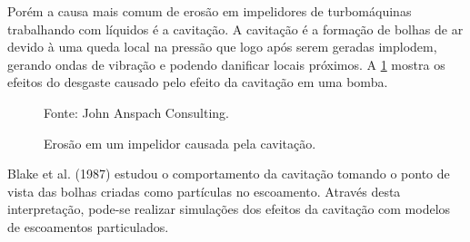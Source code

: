 Porém a causa mais comum de erosão em impelidores de turbomáquinas trabalhando com líquidos é a cavitação.
A cavitação é a formação de bolhas de ar devido à uma queda local na pressão que logo após serem geradas implodem, gerando ondas de vibração e podendo danificar locais próximos.
A \ref{JAC-Pump} mostra os efeitos do desgaste causado pelo efeito da cavitação em uma bomba.
\begin{figure}[H]
    \centering
     {\raggedleft \scriptsize Fonte: John Anspach Consulting\cite{JAC}.}
    \caption{Erosão em um impelidor causada pela cavitação.}
    \label{JAC-Pump}
\end{figure}

Blake et al. (1987)\cite{Blake-1987} estudou o comportamento da cavitação tomando o ponto de vista das bolhas criadas como partículas no escoamento.
Através desta interpretação, pode-se realizar simulações dos efeitos da cavitação com modelos de escoamentos particulados.